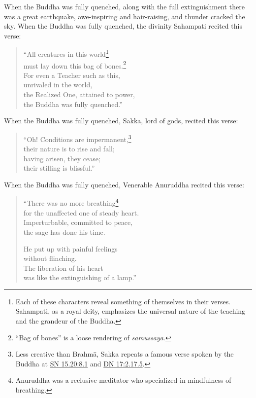 \documentclass[12pt,openany]{book}%
\begin{document}
When the Buddha was fully quenched, along with the full extinguishment there was a great earthquake, awe-inspiring and hair-raising, and thunder cracked the sky. When the Buddha was fully quenched, the divinity Sahampati recited this verse: 

\begin{verse}%
“All creatures in this world\footnote{Each of these characters reveal something of themselves in their verses. Sahampati, as a royal deity, emphasizes the universal nature of the teaching and the grandeur of the Buddha. } \\
must lay down this bag of bones.\footnote{“Bag of bones” is a loose rendering of \textit{samussaya}. } \\
For even a Teacher such as this, \\
unrivaled in the world, \\
the Realized One, attained to power, \\
the Buddha was fully quenched.” 

%
\end{verse}

When the Buddha was fully quenched, Sakka, lord of gods, recited this verse: 

\begin{verse}%
“Oh! Conditions are impermanent,\footnote{Less creative than \textsanskrit{Brahmā}, Sakka repeats a famous verse spoken by the Buddha at \href{https://suttacentral.net/sn15.20/en/sujato\#8.1}{SN 15.20:8.1} and \href{https://suttacentral.net/dn17/en/sujato\#2.17.5}{DN 17:2.17.5}. } \\
their nature is to rise and fall; \\
having arisen, they cease; \\
their stilling is blissful.” 

%
\end{verse}

When the Buddha was fully quenched, Venerable Anuruddha recited this verse: 

\begin{verse}%
“There was no more breathing\footnote{Anuruddha was a reclusive meditator who specialized in mindfulness of breathing. } \\
for the unaffected one of steady heart. \\
Imperturbable, committed to peace, \\
the sage has done his time. 

He put up with painful feelings \\
without flinching. \\
The liberation of his heart \\
was like the extinguishing of a lamp.” 

%
\end{verse}
\end{document}
